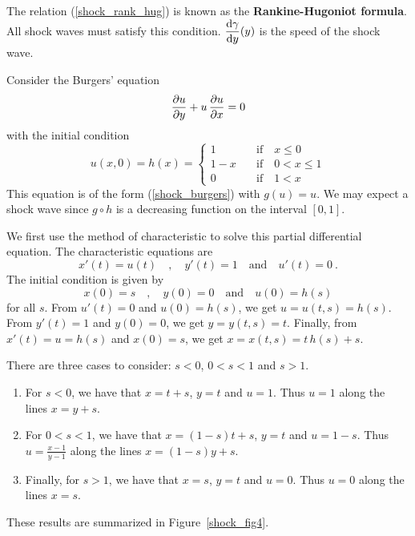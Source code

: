 The relation (\ref{shock_rank_hug}) is known as the
{\bfseries Rankine-Hugoniot formula}.
All shock waves must satisfy this condition.
$\displaystyle \frac{\mathrm{d}\gamma}{\mathrm{d}{y}}(y)$ is the speed of the shock wave.

\begin{egg}
Consider the Burgers' equation
\begin{equation} \label{shock_the_burgers}
\frac{\partial{u}}{\partial y} + u\,\frac{\partial{u}}{\partial x} = 0
\end{equation}
with the initial condition
\[
u(x,0) = h(x) =
\begin{cases} 1 & \quad \text{if} \quad x \leq 0 \\
1-x & \quad \text{if} \quad 0<x\leq 1 \\
0 & \quad \text{if} \quad 1 < x
\end{cases}
\]
This equation is of the form (\ref{shock_burgers}) with
$\displaystyle g(u) = u$.  We may expect a shock wave since $g\circ h$
is a decreasing function on the interval $[0,1]$.

We first use the method of characteristic to solve this partial
differential equation.  The characteristic equations are
\[
x'(t) = u(t) \quad , \quad y'(t) = 1 \quad \text{and} \quad u'(t) = 0 \ .
\]
The initial condition is given by
\[
x(0) = s \quad , \quad y(0) = 0 \quad \text{and} \quad u(0) = h(s)
\]
for all $s$.  From $u'(t)=0$ and $u(0)=h(s)$, we get $u = u(t,s) = h(s)$.
From $y'(t)=1$ and $y(0)=0$, we get $y = y(t,s) = t$.  Finally, from
$x'(t) = u = h(s)$ and $x(0)=s$, we get $x = x(t,s) = t\,h(s) + s$.

There are three cases to consider: $s<0$, $0<s<1$ and $s>1$.
\begin{enumerate}
\item For $s<0$, we have that $x = t+s$, $y=t$ and $u=1$.  Thus $u=1$ along the
lines $x = y +s$.
\item For $0<s<1$, we have that $x = (1-s)t+s$, $y=t$ and
$u=1-s$.  Thus $\displaystyle u=\frac{x-1}{y-1}$ along the lines
$x = (1-s)y +s$.
\item Finally, for $s>1$, we have that $x = s$, $y=t$ and
$u=0$.  Thus $u=0$ along the lines $x = s$.
\end{enumerate}
These results are summarized in Figure~\ref{shock_fig4}.



\end{egg}
